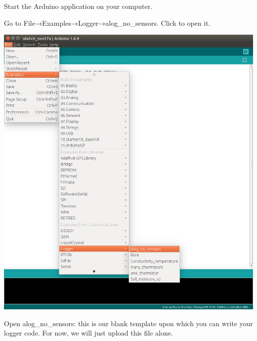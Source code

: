 \begin{DoxyEnumerate}
\item Start the Arduino application on your computer.
\item Go to File→\+Examples→\+Logger→alog\+\_\+no\+\_\+sensors. Click to open it.  
\begin{DoxyImage}
\includegraphics[width=.8\linewidth]{Open_alog_no_sensors.png}
\caption{Open alog\+\_\+no\+\_\+sensors\+: this is our blank template upon which you can write your logger code. For now, we will just upload this file alone.}
\end{DoxyImage}


\end{DoxyEnumerate}
